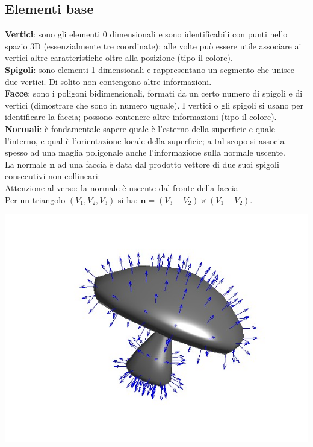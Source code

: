 \documentclass[a4paper, 10pt]{article}
\renewcommand{\vec}{\bm}
\begin{document}
	\subsection{Elementi base}
		\textbf{Vertici}: sono gli elementi 0 dimensionali e sono identificabili
		con punti nello spazio 3D (essenzialmente tre coordinate);
		alle volte può essere utile associare ai vertici altre
		caratteristiche oltre alla posizione (tipo il colore).\\
		\textbf{Spigoli}: sono elementi 1 dimensionali e rappresentano un
		segmento che unisce due vertici. Di solito non contengono
		altre informazioni.\\
		\textbf{Facce}: sono i poligoni bidimensionali, formati da un certo
		numero di spigoli e di vertici (dimostrare che sono in numero
		uguale). I vertici o gli spigoli si usano per identificare la faccia;
		possono contenere altre informazioni (tipo il colore).\\
		\textbf{Normali}: è fondamentale sapere quale è l’esterno della
		superficie e quale l’interno, e qual è l'orientazione locale della
		superficie; a tal scopo si associa spesso ad una maglia
		poligonale anche l’informazione sulla normale uscente.\\
		La normale $ \vec{n} $ ad una faccia è data dal prodotto vettore di due
		suoi spigoli consecutivi non collineari:\\
		Attenzione al verso: la normale è uscente dal fronte della faccia\\
		Per un triangolo $ (V_1 ,V_2 ,V_3 ) $ si ha: $ \vec{n} = (V_3 -V_2)\times(V_1 -V_2 ) $.
		
		\includegraphics[scale=0.3]{norm}
		
\end{document}
